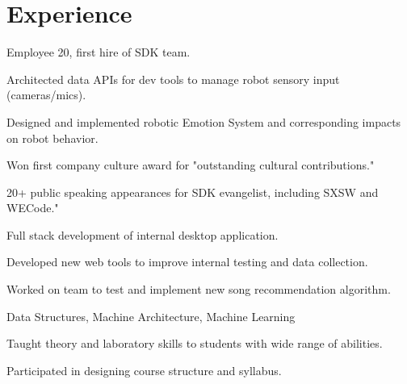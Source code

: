 \documentclass[]{csaund-resume}
\begin{document}
\hfill
\begin{minipage}[t]{0.66\textwidth}


\section{Experience}
\vspace{\topsep} %
\begin{tightemize}
\item Employee 20, first hire of SDK team.
\item Architected data APIs for dev tools to manage robot sensory input (cameras/mics).
\item Designed and implemented robotic Emotion System and corresponding impacts on robot behavior.
\item Won first company culture award for "outstanding cultural contributions."
\item 20+ public speaking appearances for SDK evangelist, including SXSW and WECode."
\end{tightemize}
\sectionsep

\vspace{\topsep} %
\begin{tightemize}
\item Full stack development of internal desktop application.
\item Developed new web tools to improve internal testing and data collection.
\item Worked on team to test and implement new song recommendation algorithm.
\end{tightemize}
\sectionsep

\begin{tightemize}
\item Data Structures, Machine Architecture, Machine Learning
\item Taught theory and laboratory skills to students with wide range of abilities.
\item Participated in designing course structure and syllabus.
\end{tightemize}
\sectionsep


\end{minipage}
\end{document}
